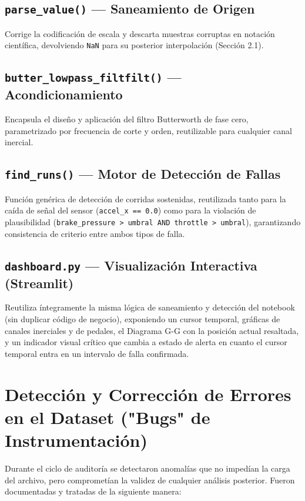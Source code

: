 \documentclass[12pt, letterpaper]{article}
\begin{document}
	\subsection{\texttt{parse\_value()} — Saneamiento de Origen}
	Corrige la codificación de escala y descarta muestras corruptas en notación científica, devolviendo \texttt{NaN} para su posterior interpolación (Sección 2.1).
	
	\subsection{\texttt{butter\_lowpass\_filtfilt()} — Acondicionamiento}
	Encapsula el diseño y aplicación del filtro Butterworth de fase cero, parametrizado por frecuencia de corte y orden, reutilizable para cualquier canal inercial.
	
	\subsection{\texttt{find\_runs()} — Motor de Detección de Fallas}
	Función genérica de detección de corridas sostenidas, reutilizada tanto para la caída de señal del sensor (\texttt{accel\_x == 0.0}) como para la violación de plausibilidad (\texttt{brake\_pressure > umbral AND throttle > umbral}), garantizando consistencia de criterio entre ambos tipos de falla.
	
	\subsection{\texttt{dashboard.py} — Visualización Interactiva (Streamlit)}
	Reutiliza íntegramente la misma lógica de saneamiento y detección del notebook (sin duplicar código de negocio), exponiendo un cursor temporal, gráficas de canales inerciales y de pedales, el Diagrama G-G con la posición actual resaltada, y un indicador visual crítico que cambia a estado de alerta en cuanto el cursor temporal entra en un intervalo de falla confirmada.
	
	\section{Detección y Corrección de Errores en el Dataset ("Bugs" de Instrumentación)}
	Durante el ciclo de auditoría se detectaron anomalías que no impedían la carga del archivo, pero comprometían la validez de cualquier análisis posterior. Fueron documentadas y tratadas de la siguiente manera:
	
\end{document}

